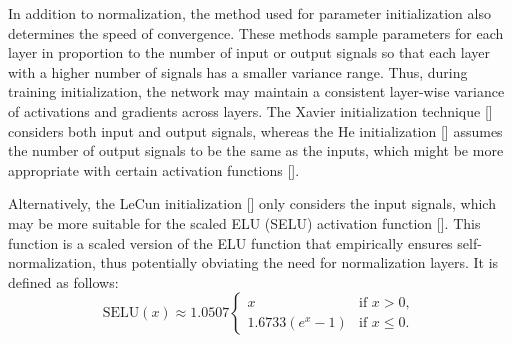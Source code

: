 \documentclass[12pt,a4paper]{report}
\begin{document}
In addition to normalization, the method used for parameter initialization also determines the speed of convergence. These methods sample parameters for each layer in proportion to the number of input or output signals so that each layer with a higher number of signals has a smaller variance range. Thus, during training initialization, the network may maintain a consistent layer-wise variance of activations and gradients across layers. The Xavier initialization technique [\cite{glorot2010}] considers both input and output signals, whereas the He initialization [\cite{he2015}] assumes the number of output signals to be the same as the inputs, which might be more appropriate with certain activation functions [\cite{mlbook}].

Alternatively, the LeCun initialization [\cite{lecun2012}] only considers the input signals, which may be more suitable for the scaled ELU (SELU) activation function [\cite{klambauer2017, mlbook}]. This function is a scaled version of the ELU function that empirically ensures self-normalization, thus potentially obviating the need for normalization layers. It is defined as follows:
%
\begin{equation}
 \text{SELU}(x) \approx 1.0507 \begin{cases} 
x & \text{if } x > 0, \\
1.6733 ( e^x - 1) & \text{if } x \leq 0 .
\end{cases}
\end{equation}
\end{document}
